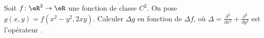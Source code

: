 \begin{exercice}\label{exoCalculDifferentiel0007}

    Soit $f \colon \eR ^2 \to \eR $ une fonction de classe $C^2$.  On pose $g(x,y) = f(x^2 -y^2, 2 xy)$.  Calculer $\Delta g$ en fonction de $\Delta f$, où $\Delta = \frac{\partial ^2 }{\partial x^2 } +  \frac{\partial ^2 }{\partial y^2 }$ est l'opérateur .

\end{exercice}
